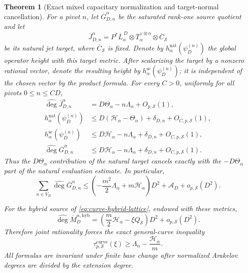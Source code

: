 \documentclass[11pt]{article}
\newtheorem{theorem}{Theorem}[section]
\theoremstyle{definition}
\theoremstyle{remark}
\newcommand{\widehatdeg}{\widehat{\deg}}
\newcommand{\Energy}{\mathscr H}
\newcommand{\LambdaAH}{\Lambda}
\begin{document}
\begin{theorem}[Exact mixed capacitary normalization and target-normal cancellation]
For a pivot $n$, let $\overline G_{D,n}^\alpha$ be the saturated rank-one
source quotient and let
\[
 \overline J_{D,n}^\alpha
 =P^*\overline L_\alpha^{\,D}
  \otimes\overline T_\alpha^{\vee\otimes n}
  \otimes\overline C_{\mathcal S}
\]
be its natural jet target, where $\overline C_{\mathcal S}$ is fixed.  Denote
by $h_\alpha^{\mathrm{nat}}(\psi_D^{(n)})$ the global operator height with
this target metric.  After scalarizing the target by a nonzero rational
vector, denote the resulting height by
$h_\alpha^{\mathrm{sc}}(\psi_D^{(n)})$; it is independent of the chosen
vector by the product formula.  For every $C>0$, uniformly for all pivots
$0\le n\le CD$,
\begin{align}
 \widehatdeg\overline J_{D,n}^\alpha
 &=D\Theta_\alpha-n\LambdaAH_\alpha+O_{p,\mathcal S}(1),
 \label{eq:exact-target-degree}\\
 h_\alpha^{\mathrm{nat}}(\psi_D^{(n)})
 &\le D(\Energy_\alpha-\Theta_\alpha)+\delta_{D,n}
       +O_{C,p,\mathcal S}(1),
 \label{eq:exact-natural-height}\\
 h_\alpha^{\mathrm{sc}}(\psi_D^{(n)})
 &\le D\Energy_\alpha-n\LambdaAH_\alpha+\delta_{D,n}
       +O_{C,p,\mathcal S}(1),
 \label{eq:exact-scalar-height}\\
 \widehatdeg\overline G_{D,n}^\alpha
 &\le D\Energy_\alpha-n\LambdaAH_\alpha+\delta_{D,n}
       +O_{C,p,\mathcal S}(1).
 \label{eq:exact-graded-degree}
\end{align}
Thus the $D\Theta_\alpha$ contribution of the natural target cancels
exactly with the $-D\Theta_\alpha$ part of the natural evaluation estimate.
In particular,
\begin{equation}\label{eq:exact-degree-sum}
 \sum_{n\in V_D}\widehatdeg\overline G_{D,n}^\alpha
 \le\left(-\frac{m^2}{2}\LambdaAH_\alpha
          +m\Energy_\alpha\right)D^2
    +\mathscr A_D+o_{p,\mathcal S}(D^2).
\end{equation}

For the hybrid source of \eqref{eq:curve-hybrid-lattice}, endowed with these
metrics,
\begin{equation}\label{eq:exact-hybrid-source}
 \widehatdeg\overline M_D^{\alpha,\mathrm{hyb}}
 =\left(\frac m2\Energy_\alpha-\xi Q_{\mathcal S}\right)D^2
  +o_{p,\mathcal S}(D^2).
\end{equation}
Therefore joint rationality forces the exact general-curve inequality
\begin{equation}\label{eq:exact-curve-slopes}
 \boxed{
 \tau^{\mathrm{curve}}_{p,\mathcal S}(\xi)
 \ge\LambdaAH_\alpha-\frac{\Energy_\alpha}{m}.}
\end{equation}
All formulas are invariant under finite base change after normalized Arakelov
degrees are divided by the extension degree.
\end{theorem}
\end{document}

